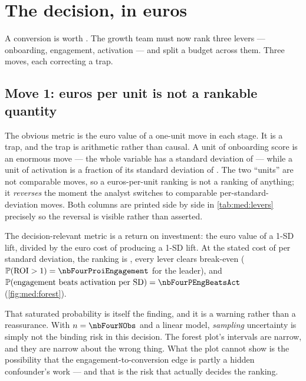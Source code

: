 \section{The decision, in euros}
\label{sec:med:euro}

A conversion is worth \eur{\nbFourValuePerConv}. The growth team must now rank three levers ---
onboarding, engagement, activation --- and split a budget across them. Three moves, each correcting
a trap.

\subsection*{Move 1: euros per unit is not a rankable quantity}

The obvious metric is the euro value of a one-unit move in each stage. It is a trap, and the trap is
arithmetic rather than causal. A unit of onboarding score is an enormous move --- the whole variable
has a standard deviation of \nbFourSdOnboarding{} --- while a unit of activation is a fraction of its
standard deviation of \nbFourSdActivated. The two ``units'' are not comparable moves, so a
euros-per-unit ranking is not a ranking of anything; it \emph{reverses} the moment the analyst
switches to comparable per-standard-deviation moves. Both columns are printed side by side in
\cref{tab:med:levers} precisely so the reversal is visible rather than asserted.

The decision-relevant metric is a return on investment: the euro value of a 1-SD lift, divided by the
euro cost of producing a 1-SD lift. At the stated cost of \eur{\nbFourCostSd} per standard deviation,
the ranking is \nbFourRanking, every lever clears break-even
($\Prob(\text{ROI} > 1) = \nbFourProiEngagement$ for the leader), and
$\Prob(\text{engagement beats activation per SD}) = \nbFourPEngBeatsAct$ (\cref{fig:med:forest}).




That saturated probability is itself the finding, and it is a warning rather than a
reassurance. With $n = \nbFourNObs$ and a linear model, \emph{sampling} uncertainty is simply not the
binding risk in this decision. The forest plot's intervals are narrow, and they are narrow about the
wrong thing. What the plot cannot show is the possibility that the engagement-to-conversion edge is
partly a hidden confounder's work --- and that is the risk that actually decides the ranking.

